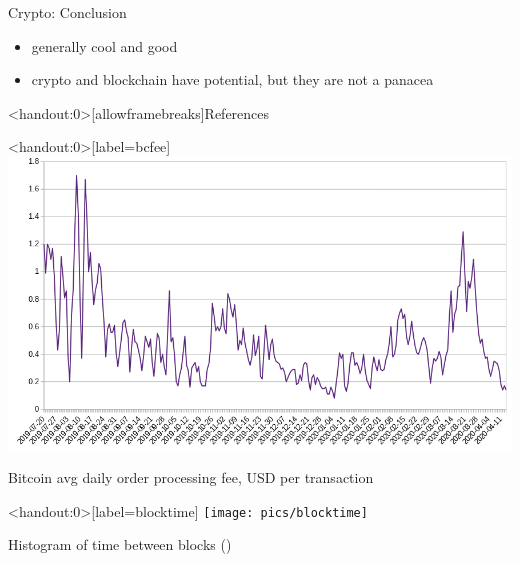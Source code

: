\documentclass[english,10pt
,aspectratio=169
]{beamer}
\begin{document}
\begin{frame}{Crypto: Conclusion}
	\begin{itemize}
		\item generally cool and good
		\item crypto and blockchain have potential, but they are not a panacea
	\end{itemize}
\end{frame}



\appendix
\begin{frame}<handout:0>[allowframebreaks]{References}
	
	
\end{frame}


\begin{frame}<handout:0>[label=bcfee]
	\centering
	\includegraphics[width=0.8\paperwidth]{pics/bitcoin_orderfee}
	
	Bitcoin avg daily order processing fee, USD per transaction \hyperlink{problems}{}
\end{frame}


\begin{frame}<handout:0>[label=blocktime]
	\centering
	\texttt{[image: pics/blocktime]}
	
	Histogram of time between blocks (\cite{lehar_miner_2020}) \hyperlink{problems}{}
\end{frame}
\end{document}
